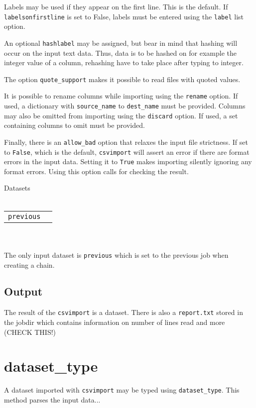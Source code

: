 Labels may be used if they appear on the first line.  This is the
default.  If \texttt{labelsonfirstline} is set to False, labels must
be entered using the \texttt{label} list option.

An optional \texttt{hashlabel} may be assigned, but bear in mind that
hashing will occur on the input text data.  Thus, data is to be hashed
on for example the integer value of a column, rehashing have to take
place after typing to integer.

The option \texttt{quote\_support} makes it possible to read files
with quoted values.

It is possible to rename columns while importing using the
\texttt{rename} option.  If used, a dictionary with
\texttt{source\_name} to \texttt{dest\_name} must be provided.
Columns may also be omitted from importing using the \texttt{discard}
option.  If used, a set containing columns to omit must be provided.

Finally, there is an \texttt{allow\_bad} option that relaxes the input
file strictness.  If set to \texttt{False}, which is the default,
\texttt{csvimport} will assert an error if there are format errors in
the input data.  Setting it to \texttt{True} makes importing silently
ignoring any format errors.  Using this option calls for checking the
result.


\noindent Datasets\\
\\
\begin{tabular}{ll}
  \texttt{previous}
\end{tabular}\\
\\
The only input dataset is \texttt{previous} which is set to the previous job when creating a chain.


\subsection{Output}
The result of the \texttt{csvimport} is a dataset.  There is also a
\texttt{report.txt} stored in the jobdir which contains information on
number of lines read and more (CHECK THIS!)






\clearpage
\section{dataset\_type}

A dataset imported with \texttt{csvimport} may be typed using
\texttt{dataset\_type}.  This method parses the input data...



